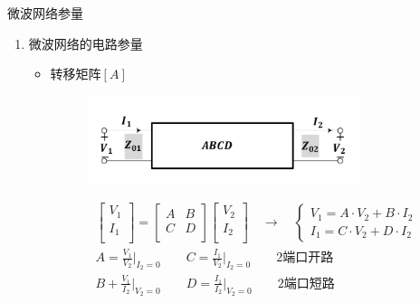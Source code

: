 \begin{frame}{微波网络参量}
    \begin{enumerate}
        \item 微波网络的电路参量
        \begin{itemize}
            \item 转移矩阵$[A]$
            \begin{figure}
                \includegraphics[width=8cm]{Cha5//fig5-8.pdf}
            \end{figure}
            \begin{gather*}
                \begin{bmatrix*}
                    V_1 \\
                    I_1 \\
                \end{bmatrix*}
                =
                \begin{bmatrix*}
                    A & B \\
                    C & D \\
                \end{bmatrix*}
                \begin{bmatrix*}
                    V_2 \\
                    I_2 \\
                \end{bmatrix*}\quad\rightarrow\quad
                \begin{cases}
                    V_1=A\cdot V_2+B\cdot I_2\\
                    I_1=C\cdot V_2+D\cdot I_2
                \end{cases}\\
                A=\frac{V_1}{V_2}\bigg|_{I_2=0}\qquad C=\frac{I_1}{V_2}\bigg|_{I_2=0}\qquad 2端口开路\\
                B+\frac{V_1}{I_2}\bigg|_{V_2=0}\qquad D=\frac{I_1}{I_2}\bigg|_{V_2=0}\qquad 2端口短路
            \end{gather*}
        \end{itemize}
    \end{enumerate}
\end{frame}

